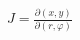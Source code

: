 \documentclass[preview]{standalone}
\begin{document}
\begin{align*}
J = \frac{\partial(x, y)}{\partial(r, \varphi)}
\end{align*}
\end{document}
